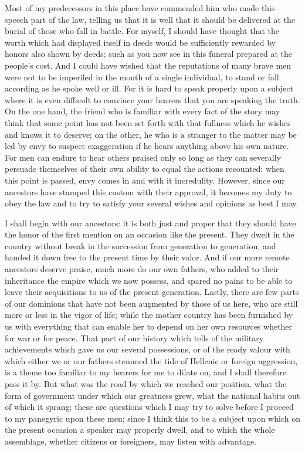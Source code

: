 \documentclass[a4paper]{amsbook}
\begin{document}
Most of my predecessors in this place have commended him who made this speech part of the law, telling us that it is well that it should be delivered at the burial of those who fall in battle. For myself, I should have thought that the worth which had displayed itself in deeds would be sufficiently rewarded by honors also shown by deeds; such as you now see in this funeral prepared at the people's cost. And I could have wished that the reputations of many brave men were not to be imperiled in the mouth of a single individual, to stand or fall according as he spoke well or ill. For it is hard to speak properly upon a subject where it is even difficult to convince your hearers that you are speaking the truth. On the one hand, the friend who is familiar with every fact of the story may think that some point has not been set forth with that fullness which he wishes and knows it to deserve; on the other, he who is a stranger to the matter may be led by envy to suspect exaggeration if he hears anything above his own nature. For men can endure to hear others praised only so long as they can severally persuade themselves of their own ability to equal the actions recounted: when this point is passed, envy comes in and with it incredulity. However, since our ancestors have stamped this custom with their approval, it becomes my duty to obey the law and to try to satisfy your several wishes and opinions as best I may.

I shall begin with our ancestors: it is both just and proper that they should have the honor of the first mention on an occasion like the present. They dwelt in the country without break in the succession from generation to generation, and handed it down free to the present time by their valor. And if our more remote ancestors deserve praise, much more do our own fathers, who added to their inheritance the empire which we now possess, and spared no pains to be able to leave their acquisitions to us of the present generation. Lastly, there are few parts of our dominions that have not been augmented by those of us here, who are still more or less in the vigor of life; while the mother country has been furnished by us with everything that can enable her to depend on her own resources whether for war or for peace. That part of our history which tells of the military achievements which gave us our several possessions, or of the ready valour with which either we or our fathers stemmed the tide of Hellenic or foreign aggression, is a theme too familiar to my hearers for me to dilate on, and I shall therefore pass it by. But what was the road by which we reached our position, what the form of government under which our greatness grew, what the national habits out of which it sprang; these are questions which I may try to solve before I proceed to my panegyric upon these men; since I think this to be a subject upon which on the present occasion a speaker may properly dwell, and to which the whole assemblage, whether citizens or foreigners, may listen with advantage.
\end{document}
